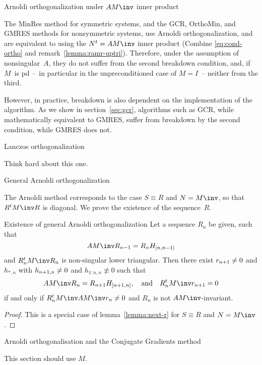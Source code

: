 \documentclass[11pt]{artikel3}
\begin{document}
\begin{Outline}
 {Arnoldi orthogonalization under $AM\inv$ inner product}
\label{sec:breakdown-aminv}

The MinRes method  for symmetric systems, and the
GCR, OrthoMin, and GMRES methods for nonsymmetric systems, use Arnoldi 
orthogonalization,
and are equivalent to using the $N^t=AM\inv$ inner product
(Combine \eqref{eq:cond-ortho} and remark~\ref{lemma:ramr-uptri}).
Therefore, under the assumption of nonsingular~$A$,
they do not suffer from the second breakdown condition,
and, if $M$~is pd --~in particular in the unpreconditioned case of $M=I$~--
neither from the third.

However, in practice, breakdown is also dependent on the implementation of
the algorithm. As we show in section~\ref{sec:gcr}, 
algorithms such as GCR,
while mathematically equivalent to GMRES, suffer from breakdown
by the second condition, while GMRES does not.

 {Lanczos orthogonalization}

Think hard about this one.

 {General Arnoldi orthogonalization}
\label{sec:arnoldi-gen}

The Arnoldi method corresponds to the case $S\equiv R$ and $N=M\inv$,
so that $R^tM\inv R$ is diagonal. We prove the existence of the sequence~$R$.

\begin{llemma}{Existence of general Arnoldi orthogonalization}
\label{lemma:next-arnoldi}
Let a sequence $R_n$ be given, such that
\[ AM\inv R_{n-1}=R_nH_{[n,n-1]} \]
and $R_n^tM\inv R_n$ is non-singular lower triangular.
Then there exist $r_{n+1}\not=\nobreak0$ and $h_{*,n}$ 
with $h_{n+1,n}\not=\nobreak0$ and $h_{1:n,n}\not\equiv0$
such that
\begin{equation}
    AM\inv R_n=R_{n+1}H_{[n+1,n]},\quad\hbox{and}\quad R_n^tM\inv r_{n+1}=0
    \label{eq:gen-h-req}\end{equation}
if and only if $R_n^tM\inv AM\inv r_n\not=0$ and
$R_n$ is not $AM\inv$-invariant.
\end{llemma}

\begin{proof}
This is a special case of lemma~\ref{lemma:next-r} for $S\equiv R$ and
$N=M\inv$.
\end{proof}

 {Arnoldi orthogonalisation and the Conjugate Gradients method}
\label{sec:arnoldi-cg}

\begin{question}
This section should use $M$.
\end{question}


\end{Outline}
\end{document}
